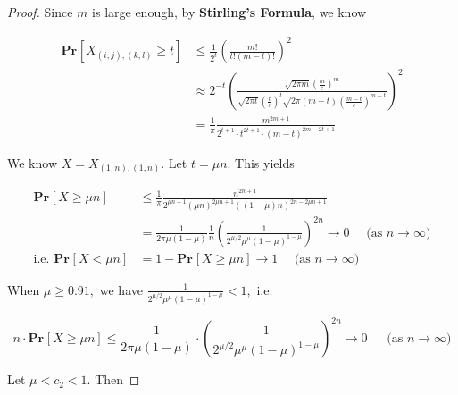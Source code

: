 \documentclass{article}
\renewcommand{\Pr}[2]{\mathbf{Pr}_{#1}\left[#2\right]}
\begin{document}
\begin{proof}
    \vspace{-1em} \hspace{1.3em}
    Since $m$ is large enough, by \textbf{Stirling's Formula}, we know
    
    \vspace{-2.7em}
    \begin{align*}
        \Pr{}{X_{(i,j),(k,l)}\geq t} &\le\frac{1}{2^{t}}\left(\frac{m!}{t!(m-t)!}\right)^2 \\
        &\approx 2^{-t}\left(\frac{\sqrt{2\pi m}\left(\frac{m}{e}\right)^m}{\sqrt{2\pi t}\left(\frac{t}{e}\right)^t\sqrt{2\pi (m-t)}\left(\frac{m-t}{e}\right)^{m-t}}\right)^2 \\
        &= \frac{1}{\pi}\frac{m^{2m+1}}{2^{t+1}\cdot t^{2t+1}\cdot (m-t)^{2m-2t+1}} 
    \end{align*}
    
    \vspace{-0.75em} \hspace{1.3em}
    We know $X=X_{(1,n),(1,n)}$. Let $t=\mu n$. This yields
    
    \vspace{-2.5em}
    \begin{align*}
        \Pr{}{X\geq \mu n} &\le\frac{1}{\pi}\frac{n^{2n+1}}{2^{\mu n+1}(\mu n)^{2\mu n+1}\left((1-\mu)n\right)^{2n-2\mu n +1}} \\
        & = \frac{1}{2\pi\mu(1-\mu)}\frac{1}{n}\left(\frac{1}{2^{\mu/2} \mu^\mu (1-\mu)^{1-\mu}}\right)^{2n} \rightarrow 0 \quad \text{ (as  $n\rightarrow \infty$)} \\
        \text{i.e. } \Pr{}{X<\mu n}&= 1 - \Pr{}{X\geq\mu n}\rightarrow 1\quad \text{ (as }n\rightarrow\infty)
    \end{align*}
    
    \vspace{-1em} \hspace{1.3em}
    When $\mu\geq0.91,$ we have $\frac{1}{2^{\mu/2} \mu^\mu (1-\mu)^{1-\mu}}<1,$ i.e.
    
    \vspace{-1.2em}
    $$n\cdot\Pr{}{X\geq \mu n} \le \frac{1}{2\pi\mu(1-\mu)}\cdot\left(\frac{1}{2^{\mu/2} \mu^\mu (1-\mu)^{1-\mu}}\right)^{2n}\rightarrow 0\quad\ \text{ (as }n\rightarrow\infty)$$
    
    \vspace{-0.5em} \hspace{1.35em}
    Let $\mu<c_2<1$. Then 
    

\end{proof}
\end{document}
